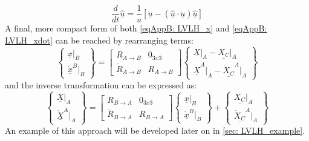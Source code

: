 	\begin{equation}
	\dfrac{d}{dt}\underline{\hat{u}} = \dfrac{1}{u} \left[ \underline{\dot{u}} - \left( \underline{\hat{u}} \cdot \underline{\dot{u}}\right) \underline{\hat{u}}\right]
	\label{eqAppB:	Unit_der}
	\end{equation}
	\indent A final, more compact form of both \ref{eqAppB: 	LVLH_x} and \ref{eqAppB: 	LVLH_xdot} can be reached by rearranging terms:
	\begin{equation}
	\left\{ \begin{array}{c}
	\underline{x}\rvert_{B} \\
	\underline{\dot{x}}^{B}\rvert_{B}
	\end{array} \right\}
	= 
	\left[\begin{array}{cc}
	R_{A\to B} & 0_{3x3} \\
	\dot{R}_{A\to B} & R_{A\to B} 
	\end{array}\right]
	\left\{ \begin{array}{c}
	\underline{X}\rvert_{A} - \underline{X_C}\rvert_{A}\\
	\underline{\dot{X}}^{A}\rvert_{A} - \underline{\dot{X}_C}^{A}\rvert_{A}
	\end{array}\right\}
	\label{eqAppB: 	LVLH}
	\end{equation}
	\noindent and the inverse transformation can be expressed as: 
	\begin{equation}
	\left\{ \begin{array}{c}
	\underline{X}\rvert_{A} \\
	\underline{\dot{X}}^{A}\rvert_{A}
	\end{array} \right\}
	= 
	\left[\begin{array}{cc}
	R_{B\to A} & 0_{3x3} \\
	\dot{R}_{B\to A} & R_{B\to A} 
	\end{array}\right]
	\left\{ \begin{array}{c}
	\underline{x}\rvert_{B} \\
	\underline{\dot{x}}^{B}\rvert_{B}
	\end{array}\right\} + 
	\left\{ \begin{array}{c}
	\underline{X_C}\rvert_{A} \\
	\underline{\dot{X}_C}^{A}\rvert_{A}
	\end{array} \right\}
	\label{eqAppB: 	LVLH_inverse}
	\end{equation}
	\indent An example of this approach will be developed later on in \ref{sec:	LVLH_example}.
